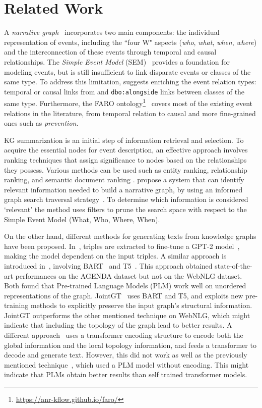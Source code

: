 \documentclass[
]{ceurart}
\begin{document}
\section{Related Work}
\label{sec:related-work}
A \textit{narrative graph}~\cite{Build_narrative} incorporates two main components: the individual representation of events, including the ``four W" aspects (\textit{who}, \textit{what}, \textit{when}, \textit{where}) and the interconnection of these events through temporal and causal relationships. The \textit{Simple Event Model} (SEM)~\cite{SEM} provides a foundation for modeling events, but is still insufficient to link disparate events or classes of the same type. To address this limitation, \citeauthor{Build_narrative} \cite{Build_narrative} suggests enriching the event relation types: temporal or causal links from \citeauthor{allen} \cite{allen} and \texttt{dbo:alongside} links between classes of the same type. Furthermore, the FARO ontology\footnote{\url{https://anr-kflow.github.io/faro/}}~\cite{beyond_causality} covers most of the existing event relations in the literature, from temporal relation to causal and more fine-grained ones such as \textit{prevention}.

KG summarization is an initial step of information retrieval and selection. To acquire the essential nodes for event description, an effective approach involves ranking techniques that assign significance to nodes based on the relationships they possess. Various methods can be used such as entity ranking, relationship ranking, and semantic document ranking \cite{JINDAL2014416}. \citeauthor{graph_traversal} propose a system that can identify relevant information needed to build a narrative graph, by using an informed graph search traversal strategy~\cite{graph_traversal}. To determine which information is considered `relevant' the method uses filters to prune the search space with respect to the Simple Event Model (What, Who, Where, When).

On the other hand, different methods for generating texts from knowledge graphs have been proposed. In~\cite{creative_story}, triples are extracted to fine-tune a GPT-2 model~\cite{GPT-2}, making the model dependent on the input triples. A similar approach is introduced in~\cite{inv_PLM}, involving BART~\cite{BART} and T5~\cite{T5}. This approach obtained state-of-the-art performances on the AGENDA dataset \cite{AGENDA_KG} but not on the WebNLG dataset. Both found that Pre-trained Language Models (PLM) work well on unordered representations of the graph. JointGT~\cite{JointGT} uses BART and T5, and exploits new pre-training methods to explicitly preserve the input graph's structural information. JointGT outperforms the other mentioned technique on WebNLG, which might indicate that including the topology of the graph lead to better results. A different approach~\cite{DRAW} uses a transformer encoding structure to encode both the global information and the local topology information, and feeds a transformer to decode and generate text. However, this did not work as well as the previously mentioned technique~\cite{inv_PLM}, which used a PLM model without encoding. This might indicate that PLMs obtain better results than self trained transformer models.
\end{document}
